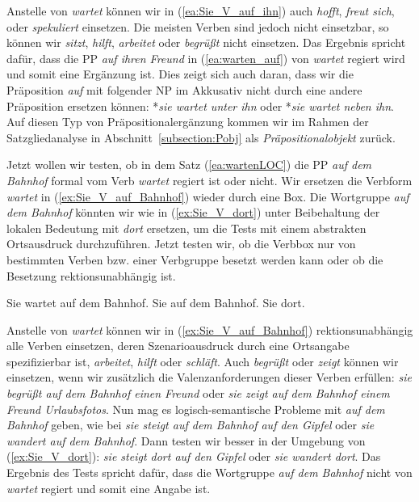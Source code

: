Anstelle von \textit{wartet} können wir in (\ref{ea:Sie_V_auf_ihn}) auch \textit{hofft}, \textit{freut sich}, oder \textit{spekuliert} einsetzen. Die meisten Verben sind jedoch nicht einsetzbar, so können wir \textit{sitzt}, \textit{hilft}, \textit{arbeitet} oder \textit{begrüßt} nicht einsetzen. Das Ergebnis spricht dafür, dass die PP \textit{auf ihren Freund} in (\ref{ea:warten_auf}) von \textit{wartet} regiert wird und somit eine Ergänzung ist. Dies zeigt sich auch daran, dass wir die Präposition \textit{auf} mit folgender NP im Akkusativ nicht durch eine andere Präposition ersetzen können: *\textit{sie wartet unter ihn} oder *\textit{sie wartet neben ihn}. Auf diesen Typ von Präpositionalergänzung kommen wir im Rahmen der Satzgliedanalyse in Abschnitt~\ref{subsection:Pobj} als \textit{Präpositionalobjekt} zurück.

Jetzt wollen wir testen, ob in dem Satz (\ref{ea:wartenLOC}) die PP \textit{auf dem Bahnhof} formal vom Verb \textit{wartet} regiert ist oder nicht. Wir ersetzen die Verbform \textit{wartet} in (\ref{ex:Sie_V_auf_Bahnhof}) wieder durch eine Box. Die Wortgruppe \textit{auf dem Bahnhof} könnten wir wie in (\ref{ex:Sie_V_dort}) unter Beibehaltung der lokalen Bedeutung mit \textit{dort} ersetzen, um die Tests mit einem abstrakten Ortsausdruck durchzuführen. Jetzt testen wir, ob die Verbbox nur von bestimmten Verben bzw. einer Verbgruppe besetzt werden kann oder ob die Besetzung rektionsunabhängig ist.

\ea \label{ea:Subkategorisierungstest4}
\ea \label{ea:wartenLOC} Sie wartet auf dem Bahnhof.
\ex \label{ex:Sie_V_auf_Bahnhof} Sie \fbox{\phantom{wartet}} auf dem Bahnhof.
\ex \label{ex:Sie_V_dort} Sie \fbox{\phantom{wartet}} dort.
\z 
\z   

Anstelle von \textit{wartet} können wir in (\ref{ex:Sie_V_auf_Bahnhof}) rektionsunabhängig alle Verben einsetzen, deren Szenarioausdruck durch eine Ortsangabe spezifizierbar ist, \zB \textit{arbeitet}, \textit{hilft} oder \textit{schläft}. Auch \textit{begrüßt} oder \textit{zeigt} können wir einsetzen, wenn wir zusätzlich die Valenzanforderungen dieser Verben erfüllen: \textit{sie begrüßt auf dem Bahnhof einen Freund} oder \textit{sie zeigt auf dem Bahnhof einem Freund Urlaubsfotos}. Nun mag es logisch-semantische Probleme mit \textit{auf dem Bahnhof} geben, wie bei \textit{sie steigt auf dem Bahnhof auf den Gipfel} oder \textit{sie wandert auf dem Bahnhof}. Dann testen wir besser in der Umgebung von (\ref{ex:Sie_V_dort}): \textit{sie steigt dort auf den Gipfel} oder \textit{sie wandert dort}. Das Ergebnis des Tests spricht dafür, dass die Wortgruppe \textit{auf dem Bahnhof} nicht von \textit{wartet} regiert und somit eine Angabe ist.

